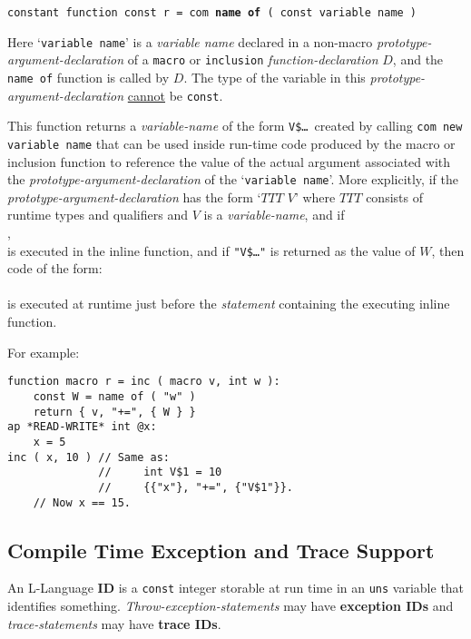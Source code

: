 \documentclass[12pt]{article}
\newcommand{\key}[1]{{\rm \bfseries #1}}
\newcommand{\ttkey}[1]{{\tt \bfseries #1}}
\newcommand{\skey}[2]{{\rm \bfseries #1#2}}
\newenvironment{indpar}[1][0.3in]%
	{\begin{list}{}%
		     {\setlength{\itemsep}{0in}%
		      \setlength{\topsep}{0in}%
		      \setlength{\parsep}{1ex}%
		      \setlength{\labelwidth}{#1}%
		      \setlength{\leftmargin}{#1}%
		      \addtolength{\leftmargin}{\labelsep}}%
	 \item}%
	{\end{list}}
\begin{document}
{\tt constant function const r = com \ttkey{name of} ( const variable name )}
\begin{indpar}
Here `{\tt variable name}' is a {\em variable name}
declared in a non-macro {\em prototype-argument-declaration} of a
{\tt macro} or {\tt inclusion} {\em function-declaration} $D$,
and the {\tt name of} function is called by $D$.
The type of the variable
in this {\em proto\-type-argument-declaration} \underline{cannot}
be {\tt const}.

This function returns a {\em variable-name} of the form
{\tt V\$\ldots}~created by calling {\tt com new variable name}
that can be used inside run-time code produced by the macro or inclusion
function to reference the value of the actual argument associated with
the {\em prototype-argument-declaration} of the `{\tt variable name}'.
More explicitly,
if the {\em proto\-type-argument-declaration} has the form `$TTT$ $V$'
where $TTT$ consists of runtime types and qualifiers and $V$ is a
{\em variable-name}, and if \\
\hspace*{1in}{\tt $W$ = name of ( "$V$" )}, \\
is executed in the inline function,
and if {\tt "V\$\ldots"} is returned as the value of $W$,
then code of the form: \\
 \\
is executed at runtime just before the {\em statement} containing
the executing inline function.
\end{indpar}

For example:
\begin{indpar}[1em]\begin{verbatim}
function macro r = inc ( macro v, int w ):
    const W = name of ( "w" )
    return { v, "+=", { W } }
ap *READ-WRITE* int @x:
    x = 5
inc ( x, 10 ) // Same as:
              //     int V$1 = 10
              //     {{"x"}, "+=", {"V$1"}}.
    // Now x == 15.
\end{verbatim}\end{indpar}

\subsection{Compile Time Exception and Trace Support}
\label{COMPILE-TIME-EXCEPTION-AND-TRACE-SUPPORT}

An L-Language \key{ID} is a {\tt const} integer storable
at run time in an {\tt uns} variable that identifies something.
{\em Throw-exception-statements} may have \skey{exception ID}s
and {\em trace-statements} may have \skey{trace ID}s.
\end{document}
